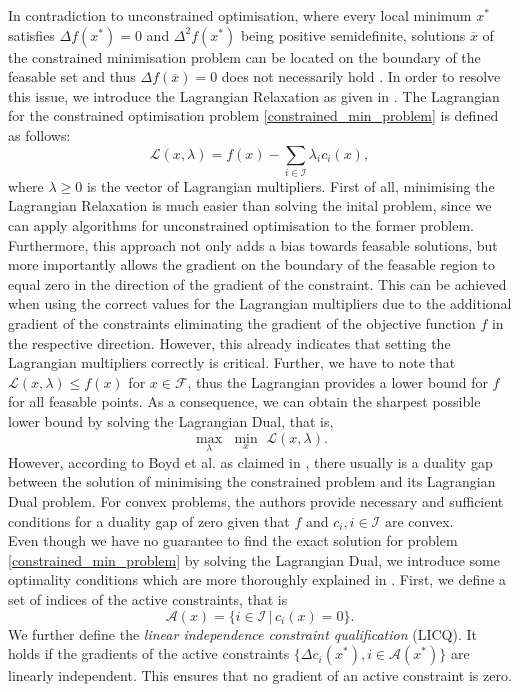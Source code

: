 \indent In contradiction to unconstrained optimisation, where every local minimum $x^*$ satisfies $\Delta f(x^*) = 0$ and $\Delta^2 f(x^*)$ being positive semidefinite, solutions $\overline{x}$ of the constrained minimisation problem can be located on the boundary of the feasable set and thus $\Delta f(\overline{x}) = 0$ does not necessarily hold \cite{NoceWrig06}. In order to resolve this issue, we introduce the Lagrangian Relaxation as given in \cite{Lemarechal:2000:LR:647776.734757}. The Lagrangian for the constrained optimisation problem \eqref{constrained_min_problem} is defined as follows:
\[ \mathcal{L}(x, \lambda) = f(x) - \sum_{i \in \mathcal{I}} \lambda_i c_i(x), \]
where $\lambda \geq 0$ is the vector of Lagrangian multipliers. First of all, minimising the Lagrangian Relaxation is much easier than solving the inital problem, since we can apply algorithms for unconstrained optimisation to the former problem. Furthermore, this approach not only adds a bias towards feasable solutions, but more importantly allows the gradient on the boundary of the feasable region to equal zero in the direction of the gradient of the constraint. This can be achieved when using the correct values for the Lagrangian multipliers due to the additional gradient of the constraints eliminating the gradient of the objective function $f$ in the respective direction. However, this already indicates that setting the Lagrangian multipliers correctly is critical. Further, we have to note that $\mathcal{L}(x, \lambda) \leq f(x)$ for $x \in \mathcal{F}$, thus the Lagrangian provides a lower bound for $f$ for all feasable points. As a consequence, we can obtain the sharpest possible lower bound by solving the Lagrangian Dual, that is, 
\[ \underset{\lambda}{\max}\,\, \underset{x}{\min}\,\, \mathcal{L}(x, \lambda). \]
However, according to Boyd et al. as claimed in \cite{Boyd:2004:CO:993483}, there usually is a duality gap between the solution of minimising the constrained problem and its Lagrangian Dual problem. For convex problems, the authors provide necessary and sufficient conditions for a duality gap of zero given that $f$ and $c_i, i \in \mathcal{I}$ are convex.\\
\indent Even though we have no guarantee to find the exact solution for problem \eqref{constrained_min_problem} by solving the Lagrangian Dual, we introduce some optimality conditions which are more thoroughly explained in \cite{NoceWrig06}. First, we define a set of indices of the active constraints, that is
\[ \mathcal{A}(x) = \{ i \in \mathcal{I} \,|\, c_i(x) = 0 \}. \]
We further define the \textit{linear independence constraint qualification} (LICQ). It holds if the gradients of the active constraints $\{ \Delta c_i(x^*), i \in \mathcal{A}(x^*) \}$ are linearly independent. This ensures that no gradient of an active constraint is zero.
